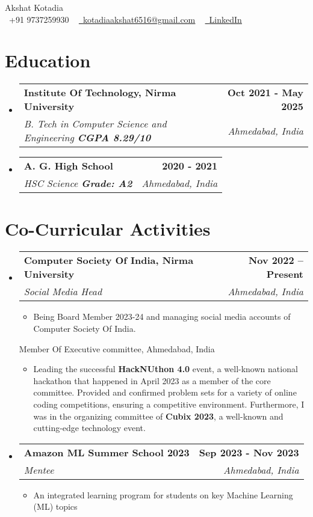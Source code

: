 \documentclass[letterpaper,11pt]{article}
\makeatletter
\newcommand{\resumeItem}[1]{
  \item\small{
	{#1 \vspace{-2pt}}
  }
}
\newcommand{\resumeSubheading}[4]{
  \vspace{-2pt}\item
	\begin{tabular*}{1.0\textwidth}[t]{l@{\extracolsep{\fill}}r}
  	\textbf{#1} & \textbf{\small #2} \\
  	\textit{\small#3} & \textit{\small #4} \\
	\end{tabular*}\vspace{-7pt}
}
\newcommand{\resumeSubHeadingListStart}{\begin{itemize}[leftmargin=0.0in, label={}]}
\newcommand{\resumeSubHeadingListEnd}{\end{itemize}}
\newcommand{\resumeItemListStart}{\begin{itemize}}
\newcommand{\resumeItemListEnd}{\end{itemize}\vspace{-5pt}}
\makeatother
\begin{document}
\begin{center}
	{\Huge  Akshat Kotadia} \\ \vspace{1pt}
	\small \raisebox{-0.1\height}\faPhone\ +91 9737259930  ~ \href{mailto:kotadiaakshat6516@gmail.com}{\raisebox{-0.4\height}\faEnvelope\  \underline{kotadiaakshat6516@gmail.com}} ~
	\href{https://www.linkedin.com/in/akshat-kotadia-32b2b6222/}{\raisebox{-0.4\height}\faLinkedin\ \underline{LinkedIn}}
 
	\vspace{-8pt}
\end{center}


\section{Education}
  \resumeSubHeadingListStart
	\resumeSubheading
  	{Institute Of Technology, Nirma University}{Oct 2021 - May 2025}
  	{B. Tech in Computer Science and Engineering \textbf{CGPA  8.29/10}}{Ahmedabad, India}

        \resumeSubheading
  	{A. G. High School}{2020 - 2021}
  	{HSC Science \textbf{Grade: A2}}{Ahmedabad, India}
  \resumeSubHeadingListEnd


\section{Co-Curricular Activities}
  \resumeSubHeadingListStart
	\resumeSubheading
  	{Computer Society Of India, Nirma University}{Nov 2022 -- Present}
  	{Social Media Head}{Ahmedabad, India}
  	\resumeItemListStart
    	\resumeItem{Being Board Member 2023-24 and managing social media accounts of Computer Society Of India.}
	\resumeItemListEnd
        {Member Of Executive committee}{, Ahmedabad, India}
  	\resumeItemListStart
    	\resumeItem{Leading the successful \textbf{HackNUthon 4.0} event, a well-known national hackathon that happened in April 2023 as a member of the core committee. Provided and confirmed problem sets for a variety of online coding competitions, ensuring a competitive environment. Furthermore, I was in the organizing committee of \textbf{Cubix 2023}, a well-known and cutting-edge technology event.}
	\resumeItemListEnd
    \vspace{2mm}
    \resumeSubheading
  	{Amazon ML Summer School 2023}{Sep 2023 - Nov 2023}
  	{Mentee}{Ahmedabad, India}
  	\resumeItemListStart
    	\resumeItem{An integrated learning program for students on key Machine Learning (ML) topics}
	\resumeItemListEnd
  \resumeSubHeadingListEnd
\vspace{-16pt}
\end{document}
